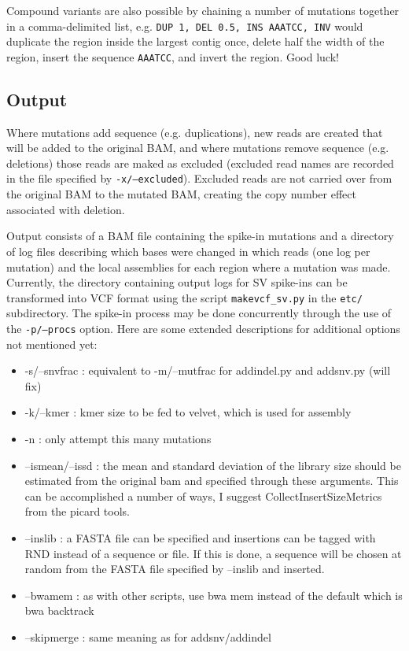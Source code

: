 \documentclass[letterpaper,11pt]{article}
\begin{document}
    Compound variants are also possible by chaining a number of mutations together in a comma-delimited list, e.g. \texttt{DUP 1, DEL 0.5, INS AAATCC, INV} would duplicate the region inside the largest contig once, delete half the width of the region, insert the sequence \texttt{AAATCC}, and invert the region. Good luck!

\subsection{Output}
    Where mutations add sequence (e.g. duplications), new reads are created that will be added to the original BAM, and where mutations remove sequence (e.g. deletions) those reads are maked as excluded (excluded read names are recorded in the file specified by \texttt{-x/--excluded}). Excluded reads are not carried over from the original BAM to the mutated BAM, creating the copy number effect associated with deletion.
    
     Output consists of a BAM file containing the spike-in mutations and a directory of log files describing which bases were changed in which reads (one log per mutation) and the local assemblies for each region where a mutation was made. Currently, the directory containing output logs for SV spike-ins can be transformed into VCF format using the script \texttt {makevcf\_sv.py} in the \texttt {etc/} subdirectory. The spike-in process may be done concurrently through the use of the \texttt {-p/--procs} option. Here are some extended descriptions for additional options not mentioned yet:
     
\begin{itemize}
\item -s/--snvfrac : equivalent to -m/--mutfrac for addindel.py and addsnv.py (will fix)
\item -k/--kmer : kmer size to be fed to velvet, which is used for assembly
\item -n : only attempt this many mutations
\item --ismean/--issd : the mean and standard deviation of the library size should be estimated from the original bam and specified through these arguments. This can be accomplished a number of ways, I suggest CollectInsertSizeMetrics from the picard tools.
\item --inslib : a FASTA file can be specified and insertions can be tagged with RND instead of a sequence or file. If this is done, a sequence will be chosen at random from the FASTA file specified by --inslib and inserted.
\item --bwamem : as with other scripts, use bwa mem instead of the default which is bwa backtrack
\item --skipmerge : same meaning as for addsnv/addindel
\end{itemize}
\end{document}
